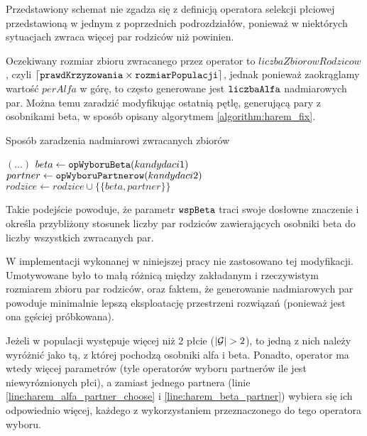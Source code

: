 \documentclass[./FM_mgr.tex]{subfiles}
\begin{document}
Przedstawiony schemat nie zgadza się z definicją operatora selekcji płciowej przedstawioną w jednym z poprzednich podrozdziałów, ponieważ w niektórych sytuacjach zwraca więcej par rodziców niż powinien. 

Oczekiwany rozmiar zbioru zwracanego przez operator to $liczbaZbiorowRodzicow$, czyli $\lceil \mathtt{prawdKrzyzowania} \times \mathtt{rozmiarPopulacji} \rceil$, jednak ponieważ zaokrąglamy wartość $perAlfa$ w górę, to często generowane jest $\mathtt{liczbaAlfa}$ nadmiarowych par.
Można temu zaradzić modyfikując ostatnią pętlę, generującą pary z osobnikami beta, w sposób opisany algorytmem \ref{algorithm:harem_fix}.

\begin{algorithm}
	\caption{Sposób zaradzenia nadmiarowi zwracanych zbiorów \label{algorithm:harem_fix}}
	\begin{algorithmic}[1]
		\Start
		\State $(\dots)$
		\setcounter{ALG@line}{14}
		\Var $beta \gets \mathtt{opWyboruBeta}(kandydaci1)$
		\Var $partner \gets \mathtt{opWyboruPartnerow}(kandydaci2)$
		\State $rodzice \gets rodzice \cup \{ \{ beta, partner \} \}$
		\EndWhile
		\State {}
		\EndOperator
	\end{algorithmic}
\end{algorithm}

Takie podejście powoduje, że parametr $\mathtt{wspBeta}$ traci swoje dosłowne znaczenie i określa przybliżony stosunek liczby par rodziców zawierających osobniki beta do liczby wszystkich zwracanych par.

W implementacji wykonanej w niniejszej pracy nie zastosowano tej modyfikacji.
Umotywowane było to małą różnicą między zakładanym i rzeczywistym rozmiarem zbioru par rodziców, oraz faktem, że  generowanie nadmiarowych par powoduje minimalnie lepszą eksploatację przestrzeni rozwiązań (ponieważ jest ona gęściej próbkowana).

Jeżeli w populacji występuje więcej niż 2 płcie ($|\mathcal{G}| > 2$), to jedną z nich należy wyróżnić jako tą, z której pochodzą osobniki alfa i beta. 
Ponadto, operator ma wtedy więcej parametrów (tyle operatorów wyboru partnerów ile jest niewyróznionych płci), a zamiast jednego partnera (linie \ref{line:harem_alfa_partner_choose} i \ref{line:harem_beta_partner}) wybiera się ich odpowiednio więcej, każdego z wykorzystaniem przeznaczonego do tego operatora wyboru.
\end{document}
